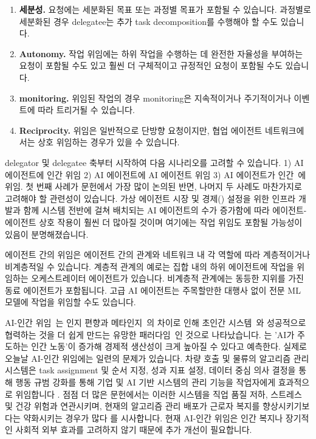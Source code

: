 \documentclass[11pt, a4paper, twocolumn, copyright, goog]{google}
\begin{document}
\begin{enumerate}
\begin{enumerate}
        \end{enumerate}
    \item \textbf{세분성.} 요청에는 세분화된 목표 또는 과정별 목표가 포함될 수 있습니다. 과정별로 세분화된 경우 delegatee는 추가 task decomposition를 수행해야 할 수도 있습니다.
    \item \textbf{Autonomy.} 작업 위임에는 하위 작업을 수행하는 데 완전한 자율성을 부여하는 요청이 포함될 수도 있고 훨씬 더 구체적이고 규정적인 요청이 포함될 수도 있습니다.
    \item \textbf{monitoring.} 위임된 작업의 경우 monitoring은 지속적이거나 주기적이거나 이벤트에 따라 트리거될 수 있습니다.
    \item \textbf{Reciprocity.} 위임은 일반적으로 단방향 요청이지만, 협업 에이전트 네트워크에서는 상호 위임하는 경우가 있을 수 있습니다.
\end{enumerate}

delegator 및 delegatee 축부터 시작하여 다음 시나리오를 고려할 수 있습니다. 1) AI 에이전트에 인간 위임 2) AI 에이전트에 AI 에이전트 위임 3) AI 에이전트가 인간~\citep{guggenberger2023task, ashton2022corrupting}에 위임. 첫 번째 사례가 문헌에서 가장 많이 논의된 반면, 나머지 두 사례도 마찬가지로 고려해야 할 관련성이 있습니다. 가상 에이전트 시장 및 경제(\citep{yang2025agent, tomasev2025virtualagenteconomies, hadfield2025economy}) 설정을 위한 인프라 개발과 함께 시스템 전반에 걸쳐 배치되는 AI 에이전트의 수가 증가함에 따라 에이전트-에이전트 상호 작용이 훨씬 더 많아질 것이며 여기에는 작업 위임도 포함될 가능성이 있음이 분명해졌습니다. 

에이전트 간의 위임은 에이전트 간의 관계와 네트워크 내 각 역할에 따라 계층적이거나 비계층적일 수 있습니다. 계층적 관계의 예로는 집합 내의 하위 에이전트에 작업을 위임하는 오케스트레이터 에이전트가 있습니다. 비계층적 관계에는 동등한 지위를 가진 동료 에이전트가 포함됩니다. 고급 AI 에이전트는 주목할만한 대행사 없이 전문 ML 모델에 작업을 위임할 수도 있습니다. 

AI-인간 위임~\citep{guggenberger2023task}는 인지 편향과 메타인지~\citep{fugener2019cognitive}의 차이로 인해 초인간 시스템~\citep{fugener2022cognitive}와 성공적으로 협력하는 것을 더 쉽게 만드는 유망한 패러다임~\citep{hemmer2023human}인 것으로 나타났습니다. \citet{davidson2025theindustrialexp}는 'AI가 주도하는 인간 노동'이 증가해 경제적 생산성이 크게 높아질 수 있다고 예측한다. 실제로 오늘날 AI-인간 위임에는 일련의 문제가 있습니다. 차량 호출 및 물류의 알고리즘 관리 시스템은 task assignment 및 순서 지정, 성과 지표 설정, 데이터 중심 의사 결정을 통해 행동 규범 강화를 통해 기업 및 AI 기반 시스템의 관리 기능을 작업자에게 효과적으로 위임합니다 \citep{rosenblat2016algorithmic,lee2015working,beverungen2021remote}. 점점 더 많은 문헌에서는 이러한 시스템을 직업 품질 저하, 스트레스 및 건강 위험과 연관시키며, 현재의 알고리즘 관리 배포가 근로자 복지를 향상시키기보다는 약화시키는 경우가 많다 \citep{vignola2023workers,goods2019is, ashton2022corrupting}를 시사합니다. 현재 AI-인간 위임은 인간 복지나 장기적인 사회적 외부 효과를 고려하지 않기 때문에 추가 개선이 필요합니다. 
\end{document}
